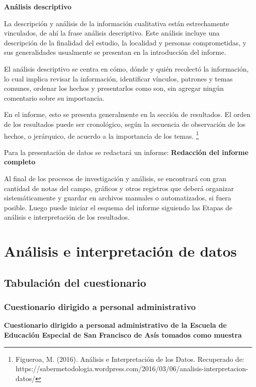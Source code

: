 \documentclass[12pt]{report}%
\begin{document}
\textbf{ Análisis descriptivo} 

La descripción y análisis de la información cualitativa están estrechamente vinculados, de ahí la frase análisis descriptivo. Este análisis incluye una descripción de la finalidad del estudio, la localidad y personas comprometidas, y sus generalidades usualmente se presentan en la introducción del informe. 

El análisis descriptivo se centra en cómo, dónde y quién recolectó la información, lo cual implica revisar la información, identificar vínculos, patrones y temas comunes, ordenar los hechos y presentarlos como son, sin agregar ningún comentario sobre su importancia. 

En el informe, esto se presenta generalmente en la sección de resultados. El orden de los resultados puede ser cronológico, según la secuencia de observación de los hechos, o jerárquico, de acuerdo a la importancia de los temas. \footnote{Figueroa, M. (2016). Análisis e Interpretación de los Datos. Recuperado de: https://sabermetodologia.wordpress.com/2016/03/06/analisis-interpretacion-datos/ }

Para la presentación de datos se redactará un informe:
\textbf{ Redacción del informe completo}

Al final de los procesos de investigación y análisis, se encontrará con gran cantidad de notas del campo, gráficos y otros registros que deberá organizar sistemáticamente y guardar en archivos manuales o automatizados, si fuera posible. Luego puede iniciar el esquema del informe siguiendo las Etapas de análisis e interpretación de los resultados. 

\newpage

\chapter{Análisis e interpretación de datos}%
\newpage
\section{Tabulación del cuestionario }
\subsection{Cuestionario dirigido a personal administrativo}
\textbf{Cuestionario dirigido a personal administrativo de la Escuela de Educación Especial de San Francisco de Asís tomados como muestra}
\end{document}
